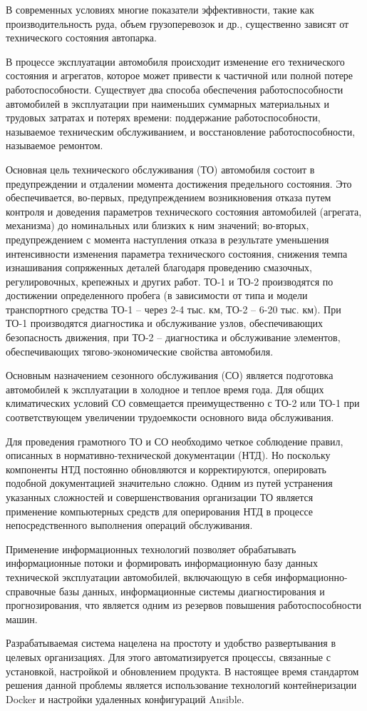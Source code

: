 
В современных условиях многие показатели эффективности, такие как
производительность руда, объем грузоперевозок и др., существенно зависят от
технического состояния автопарка.

В процессе эксплуатации автомобиля происходит изменение его технического
состояния и агрегатов, которое может привести к частичной или полной потере
работоспособности. Существует два способа обеспечения работоспособности
автомобилей в эксплуатации при наименьших суммарных материальных и трудовых
затратах и потерях времени: поддержание работоспособности, называемое
техническим обслуживанием, и восстановление работоспособности, называемое
ремонтом.

Основная цель технического обслуживания (ТО) автомобиля состоит в предупреждении
и отдалении момента достижения предельного состояния. Это обеспечивается,
во-первых, предупреждением возникновения отказа путем контроля и доведения
параметров технического состояния автомобилей (агрегата, механизма) до
номинальных или близких к ним значений; во-вторых, предупреждением с момента
наступления отказа в результате уменьшения интенсивности изменения параметра
технического состояния, снижения темпа изнашивания сопряженных деталей благодаря
проведению смазочных, регулировочных, крепежных и других работ. ТО-1 и ТО-2
производятся по достижении определенного пробега (в зависимости от типа и модели
транспортного средства ТО-1 -- через 2-4 тыс. км, ТО-2 -- 6-20 тыс. км). При
ТО-1 производятся диагностика и обслуживание узлов, обеспечивающих безопасность
движения, при ТО-2 -- диагностика и обслуживание элементов, обеспечивающих
тягово-экономические свойства автомобиля.

Основным назначением сезонного обслуживания (СО) является подготовка автомобилей
к эксплуатации в холодное и теплое время года. Для общих климатических условий
СО совмещается преимущественно с ТО-2 или ТО-1 при соответствующем увеличении
трудоемкости основного вида обслуживания.

Для проведения грамотного ТО и СО необходимо четкое соблюдение правил, описанных
в нормативно-технической документации (НТД). Но поскольку компоненты НТД
постоянно обновляются и корректируются, оперировать подобной документацией
значительно сложно. Одним из путей устранения указанных сложностей и
совершенствования организации ТО является применение компьютерных средств для
оперирования НТД в процессе непосредственного выполнения операций обслуживания.

Применение информационных технологий позволяет обрабатывать информационные
потоки и формировать информационную базу данных технической эксплуатации
автомобилей, включающую в себя информационно-справочные базы данных,
информационные системы диагностирования и прогнозирования, что является одним из
резервов повышения работоспособности машин.

Разрабатываемая система нацелена на простоту и удобство развертывания в целевых
организациях. Для этого автоматизируется процессы, связанные с установкой,
настройкой и обновлением продукта. В настоящее время стандартом решения данной
проблемы является использование технологий контейнеризации Docker и настройки
удаленных конфигураций Ansible.
